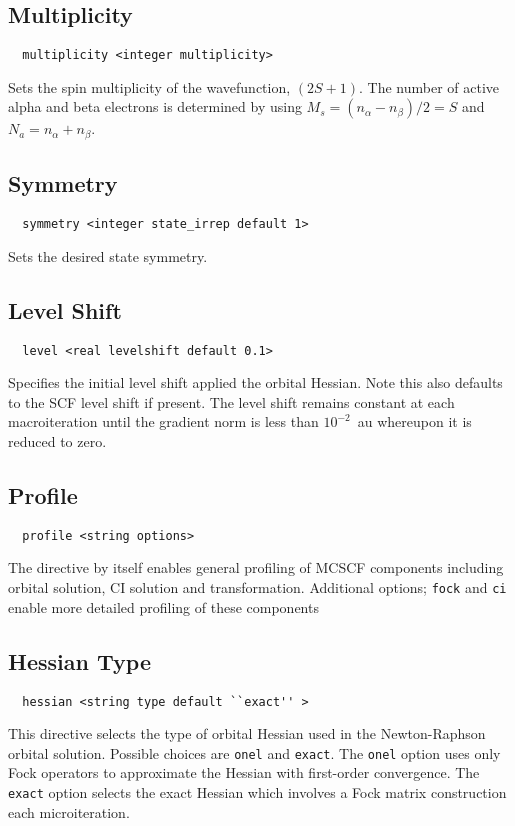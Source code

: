 \subsection{Multiplicity}
\begin{verbatim}
  multiplicity <integer multiplicity>
\end{verbatim}
Sets the spin multiplicity of the wavefunction, $(2S + 1)$. The number
of active alpha and beta electrons is determined by using $M_{s} =
(n_{\alpha} - n_{\beta})/2 = S$ and $N_{a} = n_{\alpha} + n_{\beta}$.

\subsection{Symmetry}
\begin{verbatim}
  symmetry <integer state_irrep default 1>
\end{verbatim}
Sets the desired state symmetry.

\subsection{Level Shift}
\begin{verbatim}
  level <real levelshift default 0.1>
\end{verbatim}
Specifies the initial level shift applied the orbital Hessian. Note
this also defaults to the SCF level shift if present. The level shift
remains constant at each macroiteration until the gradient norm is
less than $10^{-2}$~au whereupon it is reduced to zero.

\subsection{Profile}
\begin{verbatim}
  profile <string options>
\end{verbatim}
The directive by itself enables general profiling of MCSCF components
including orbital solution, CI solution and transformation. Additional
options; \verb+fock+ and \verb+ci+ enable more detailed profiling of
these components

\subsection{Hessian Type}
\begin{verbatim}
  hessian <string type default ``exact'' >
\end{verbatim}
This directive selects the type of orbital Hessian used in the
Newton-Raphson orbital solution. Possible choices are \verb+onel+ and
\verb+exact+. The \verb+onel+ option uses only Fock operators to
approximate the Hessian with first-order convergence. The \verb+exact+
option selects the exact Hessian which involves a Fock matrix
construction each microiteration. 

